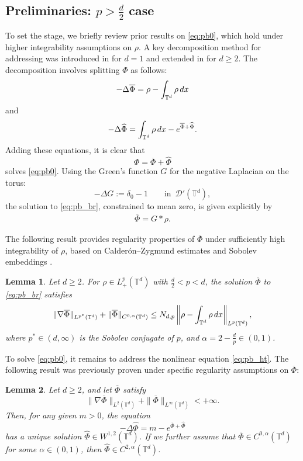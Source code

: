 \documentclass[11pt,reqno,a4paper]{amsart}
\newcommand{\intt}{\int_{\T^d}}
\newtheorem{lemma}{Lemma}[section]
\theoremstyle{definition}
\theoremstyle{remark}
\numberwithin{equation}{section}
\newcommand{\T} {\mathbb T}
\newcommand{\lt}{\left}
\newcommand{\rt}{\right}
\newcommand{\bq}{\begin{equation}}
\newcommand{\eq}{\end{equation}}
\newcommand{\calD}{\mathcal D}
\newcommand{\dx}{\textnormal{d}x}
\begin{document}
\subsection{Preliminaries: $p>\frac{d}{2}$ case}\label{sec: d2}

To set the stage, we briefly review prior results on \eqref{eq:pb0}, which hold under higher integrability assumptions on $\rho$. A key decomposition method for addressing was introduced in \cite{hankwaniacobelli2017b} for $d =1$ and extended in \cite{griffinpickeringiacobelli2021Torus} for $d \ge 2$. The decomposition involves splitting $\Phi$ as follows:
\bq\label{eq:pb_br}
-\Delta \overline{\Phi} = \rho - \intt \rho\, \dx
\eq
and
\bq\label{eq:pb_ht}    
-\Delta \widehat{\Phi} = \intt \rho \, \dx - e^{\overline{\Phi} + \widehat{\Phi}}.
\eq
Adding these equations, it is clear that 
\[
\Phi=\overline{\Phi}+\widehat{\Phi}
\]
solves \eqref{eq:pb0}. Using the Green's function $G$ for the negative Laplacian on the torus:
\[
-\Delta G := \delta_0 - 1\qquad \text{in}\,\,\,\calD'(\T^d),
\]
the solution to \eqref{eq:pb_br}, constrained to mean zero, is given explicitly by
\begin{align*}
    \overline{\Phi} = G * \rho.
\end{align*}

The following result provides regularity properties of $\overline{\Phi}$ under sufficiently high integrability of $\rho$, based on Calder\'on--Zygmund estimates and Sobolev embeddings \cite{gilbargtrudinger1977}. 
\begin{lemma}\label{lem:lin}
Let $d\ge 2$. For $\rho \in L^p_+(\T^d)$ with $\frac{d}{2}<p <d$, the solution $\overline{\Phi}$ to \eqref{eq:pb_br} satisfies
\[
\|\nabla \overline{\Phi}\|_{L^{p^*}(\T^d)} + \|\overline{\Phi}\|_{C^{0,\alpha}(\T^d)} \le N_{d,p}\lt\|\rho - \int_{\T^d}\rho\,\dx \rt\|_{L^p(\T^d)},
\]
where $p^*\in (d, \infty)$ is the Sobolev conjugate of $p$, and $\alpha= 2- \frac{d}{p} \in (0,1)$.
\end{lemma}

To solve \eqref{eq:pb0}, it remains to address the nonlinear equation \eqref{eq:pb_ht}. The following result was previously proven under specific regularity assumptions on $\overline{\Phi}$:
\begin{lemma}\cite[Proposition 3.5]{griffinpickeringiacobelli2021Torus}
\label{lem:IGP} 
Let $d\ge2$, and let $\overline{\Phi}$ satisfy
\begin{equation}\label{eq: assumption: igp}
\|\nabla\overline{\Phi}\|_{L^2(\T^d)} + \|\overline{\Phi}\|_{L^\infty(\T^d)} <+\infty.
\end{equation}
Then, for any given $m>0$, the equation
\begin{equation}\label{eq : m hat}
-\Delta \widehat{\Phi} = m - e^{\overline{\Phi}+ \widehat{\Phi}}
\end{equation}
has a unique solution $\widehat{\Phi} \in W^{1,2}(\T^d)$. If we further assume that $\overline{\Phi} \in C^{0,\alpha}(\T^d)$ for some $\alpha \in (0,1)$, then $\widehat{\Phi} \in C^{2,\alpha}(\T^d)$.
\end{lemma}
\end{document}

